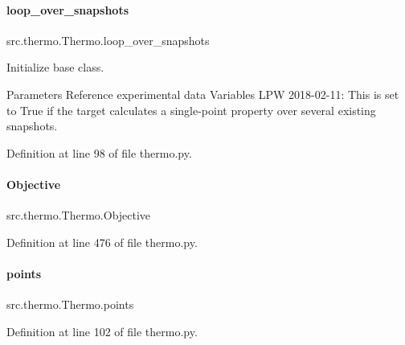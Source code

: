 \mbox{\label{classsrc_1_1thermo_1_1Thermo_ae0461d1a1ad33e619a2e8e6a9f73d0ff}} 
\paragraph{\texorpdfstring{loop\+\_\+over\+\_\+snapshots}{loop\_over\_snapshots}}
{\footnotesize\ttfamily src.\+thermo.\+Thermo.\+loop\+\_\+over\+\_\+snapshots}



Initialize base class. 

Parameters Reference experimental data Variables L\+PW 2018-\/02-\/11\+: This is set to True if the target calculates a single-\/point property over several existing snapshots. 

Definition at line 98 of file thermo.\+py.

\mbox{\label{classsrc_1_1thermo_1_1Thermo_a001e7b98ef31162bd4708c8cc5a4d9b7}} 
\paragraph{\texorpdfstring{Objective}{Objective}}
{\footnotesize\ttfamily src.\+thermo.\+Thermo.\+Objective}



Definition at line 476 of file thermo.\+py.

\mbox{\label{classsrc_1_1thermo_1_1Thermo_aaeeea9d4ee23f01a929279f33988bb9b}} 
\paragraph{\texorpdfstring{points}{points}}
{\footnotesize\ttfamily src.\+thermo.\+Thermo.\+points}



Definition at line 102 of file thermo.\+py.

